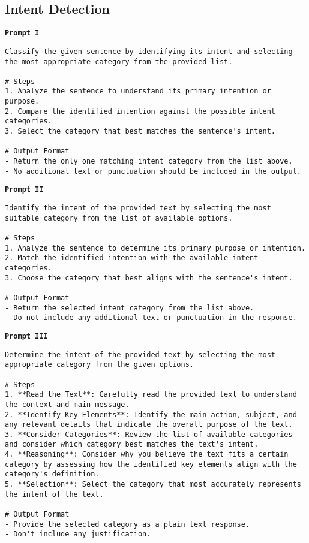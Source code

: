\subsection{Intent Detection}
\texttt{\textbf{Prompt I}}
\begin{verbatim}
Classify the given sentence by identifying its intent and selecting the most appropriate category from the provided list.

# Steps
1. Analyze the sentence to understand its primary intention or purpose.
2. Compare the identified intention against the possible intent categories.
3. Select the category that best matches the sentence's intent.

# Output Format
- Return the only one matching intent category from the list above. 
- No additional text or punctuation should be included in the output. 
\end{verbatim}
\texttt{\textbf{Prompt II}}
\begin{verbatim}
Identify the intent of the provided text by selecting the most suitable category from the list of available options.

# Steps
1. Analyze the sentence to determine its primary purpose or intention.
2. Match the identified intention with the available intent categories.
3. Choose the category that best aligns with the sentence's intent.

# Output Format
- Return the selected intent category from the list above.
- Do not include any additional text or punctuation in the response.
\end{verbatim}
\texttt{\textbf{Prompt III}}
\begin{verbatim}
Determine the intent of the provided text by selecting the most appropriate category from the given options.

# Steps
1. **Read the Text**: Carefully read the provided text to understand the context and main message.
2. **Identify Key Elements**: Identify the main action, subject, and any relevant details that indicate the overall purpose of the text.
3. **Consider Categories**: Review the list of available categories and consider which category best matches the text's intent.
4. **Reasoning**: Consider why you believe the text fits a certain category by assessing how the identified key elements align with the category's definition.
5. **Selection**: Select the category that most accurately represents the intent of the text.

# Output Format
- Provide the selected category as a plain text response. 
- Don't include any justification.
\end{verbatim}
